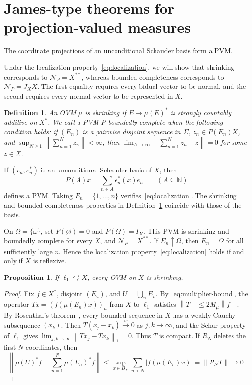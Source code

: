 \documentclass[11pt,leqno]{amsart}
\theoremstyle{compact}
\numberwithin{equation}{section}
\newtheorem{proposition}[theorem]{Proposition}
\newtheorem{definition}[theorem]{Definition}
\theoremstyle{compactremark}
\theoremstyle{compact}
\newcommand{\1}{\mathbbm{1}}
\newcommand{\N}{\mathbb{N}}
\newcommand{\norm}[1]{\left\|#1\right\|}
\newcommand{\abs}[1]{\left|#1\right|}
\begin{document}
\section{James-type theorems for projection-valued measures}

The coordinate projections of an unconditional Schauder basis form a PVM.

Under the localization property~\eqref{eq:localization}, we will show that shrinking corresponds to $\mathcal N_P=X^{**}$, whereas bounded completeness corresponds to $\mathcal N_P=J_XX$. The first equality requires every bidual vector to be normal, and the second requires every normal vector to be represented in $X$.

\begin{definition}\label{def:shrinking-bounded-complete}
An OVM $\mu$ is \emph{shrinking} if $E\mapsto\mu(E)^*$ is strongly countably additive on $X^*$. We call a PVM $P$ \emph{boundedly complete} when the following condition holds: if $(E_n)$ is a pairwise disjoint sequence in $\Sigma$, $z_n\in P(E_n)X$, and $\sup_{N\geq1}\norm{\sum_{n=1}^Nz_n}<\infty$, then $\lim_{N\to\infty}\norm{\sum_{n=1}^Nz_n-z}=0$ for some $z\in X$.
\end{definition}

\begingroup
If $(e_n,e_n^*)$ is an unconditional Schauder basis of $X$, then
\[
P(A)x=\sum_{n\in A}e_n^*(x)e_n\qquad(A\subseteq\N)
\]
defines a PVM. Taking $E_n=\{1,\ldots,n\}$ verifies~\eqref{eq:localization}. The shrinking and bounded completeness properties in Definition~\ref{def:shrinking-bounded-complete} coincide with those of the basis.

On $\Omega=\{\omega\}$, set $P(\varnothing)=0$ and $P(\Omega)=I_X$. This PVM is shrinking and boundedly complete for every $X$, and $\mathcal N_P=X^{**}$. If $E_n\uparrow\Omega$, then $E_n=\Omega$ for all sufficiently large $n$. Hence the localization property~\eqref{eq:localization} holds if and only if $X$ is reflexive.
\par\endgroup

\begin{proposition}\label{prop:no-l1-general}
If $\ell_1\not\hookrightarrow X$, every OVM on $X$ is shrinking.
\end{proposition}

\begin{proof}
Fix $f\in X^*$, disjoint $(E_n)$, and $U=\bigcup_nE_n$. By~\eqref{eq:multiplier-bound}, the operator $Tx=(f(\mu(E_n)x))_n$ from $X$ to $\ell_1$ satisfies $\norm{T}\leq2M_\mu\norm{f}$. By Rosenthal's theorem~\cite{Rosenthal1974}, every bounded sequence in $X$ has a weakly Cauchy subsequence $(x_k)$. Then $T(x_j-x_k)\xrightarrow{w}0$ as $j,k\to\infty$, and the Schur property of $\ell_1$ gives $\lim_{j,k\to\infty}\norm{Tx_j-Tx_k}_1=0$. Thus $T$ is compact. If $R_N$ deletes the first $N$ coordinates, then
\[
\norm{\mu(U)^*f-\sum_{n=1}^N\mu(E_n)^*f}
\leq\sup_{x\in B_X}\sum_{n>N}\abs{f(\mu(E_n)x)}
=\norm{R_NT}\longrightarrow0.
\]
\end{proof}
\end{document}
